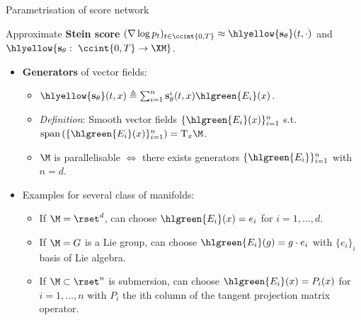    
   
   \begin{frame}{Parametrisation of score network}
   
   Approximate \textbf{Stein score} $(\nabla \log p_t)_{t \in \ccint{0,T}} \approx \hlyellow{\mathbf{s}_\theta} (t, \cdot)$ and $\hlyellow{\mathbf{s}_\theta: \ \ccint{0,T} \to \XM}$.
   \pause
   \vfill
   \begin{itemize} [triangle]
       \item \textbf{Generators} of vector fields:
   \begin{itemize} [circle]
       \item $\hlyellow{\mathbf{s}_\theta}(t,x) \triangleq \sum_{i=1}^n \mathbf{s}^i_\theta(t,x) \hlgreen{E_i}(x)$.
       \item \textit{Definition}: Smooth vector fields $\{\hlgreen{E_i}(x)\}_{i=1}^n$ s.t.\
   $\text{span}\left( \{\hlgreen{E_i}(x)\}_{i=1}^n \right) = \mathrm{T}_x\M$.
       \item $\M$ is parallelisable $\Leftrightarrow$ there exists generators $\{\hlgreen{E_i}\}_{i=1}^n$ with $n = d$.
    \end{itemize}
   \end{itemize}
    \pause
    \begin{itemize} [triangle]
       \item Examples for several class of manifolds:
     \begin{itemize} [circle]
       \item If $\M=\rset^d$, can choose $\hlgreen{E_i}(x) = e_i$ for $i=1,\dots,d$.
       \item If $\M=G$ is a Lie group, can choose $\hlgreen{E_i}(g) = g \cdot e_i$ with $\{e_i\}_i$ basis of Lie algebra.
       \item If $\M \subset \rset^n$ is submersion, can choose $\hlgreen{E_i}(x) = P_i(x)$ for $i=1,\dots,n$ with $P_i$ the ith column of the tangent projection matrix operator.
       \end{itemize}
   \end{itemize} 
   
   \end{frame}
   
   
   
       
   
